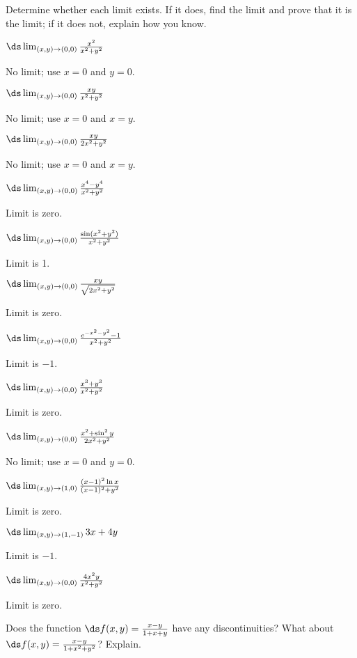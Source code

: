 \begin{exercises}

Determine whether each limit exists. If it does, find the limit
and prove that it is the limit; if it does not, explain how you know.

\exercise $\ds\lim_{(x,y)\to(0,0)}{x^2\over x^2+y^2}$
\begin{answer} No limit; use $x=0$ and $y=0$.
\end{answer}

\exercise $\ds\lim_{(x,y)\to(0,0)}{xy\over x^2+y^2}$
\begin{answer} No limit; use $x=0$ and $x=y$.
\end{answer}

\exercise $\ds\lim_{(x,y)\to(0,0)}{xy\over 2x^2+y^2}$
\begin{answer} No limit; use $x=0$ and $x=y$.
\end{answer}

\exercise $\ds\lim_{(x,y)\to(0,0)}{x^4-y^4\over x^2+y^2}$
\begin{answer} Limit is zero.
\end{answer}

\exercise $\ds\lim_{(x,y)\to(0,0)}{\sin(x^2+y^2)\over x^2+y^2}$
\begin{answer} Limit is 1.
\end{answer}

\exercise $\ds\lim_{(x,y)\to(0,0)}{xy\over \sqrt{2x^2+y^2}}$
\begin{answer} Limit is zero.
\end{answer}

\exercise $\ds\lim_{(x,y)\to(0,0)} {e^{-x^2-y^2}-1\over x^2+y^2}$
\begin{answer} Limit is $-1$.
\end{answer}

\exercise $\ds\lim_{(x,y)\to(0,0)}{x^3+y^3\over x^2+y^2}$
\begin{answer} Limit is zero.
\end{answer}

\exercise $\ds\lim_{(x,y)\to(0,0)}{x^2 + \sin^2 y\over 2x^2+y^2}$
\begin{answer} No limit; use $x=0$ and $y=0$.
\end{answer}

\exercise $\ds\lim_{(x,y)\to(1,0)}{(x-1)^2\ln x\over(x-1)^2+y^2}$
\begin{answer} Limit is zero.
\end{answer}

\exercise $\ds\lim_{(x,y)\to(1,-1)}{3x+4y}$
\begin{answer} Limit is $-1$.
\end{answer}

\exercise $\ds\lim_{(x,y)\to(0,0)}{4x^2y\over x^2+y^2}$
\begin{answer} Limit is zero.
\end{answer}

\exercise Does the function $\ds f(x,y)={x-y\over 1+x+y}$ 
have any discontinuities?  What about 
$\ds f(x,y)={x-y\over 1+x^2+y^2}$?  Explain.

\end{exercises}

